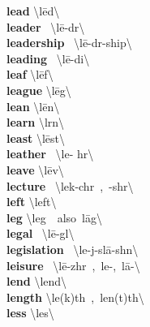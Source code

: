 \documentclass[10pt,a4paper]{article}
\begin{document}
\begin{multicols}{2}
\textbf{ lead }\quad \textbackslash \textprimstress l\={e}d\textbackslash \\
\textbf{ leader }\quad \ \textbackslash \textprimstress l\={e}-d\textschwa r\textbackslash \\
\textbf{ leadership }\quad \ \textbackslash \textprimstress l\={e}-d\textschwa r-\textsecstress ship\textbackslash \\
\textbf{ leading }\quad \ \textbackslash \textprimstress l\={e}-di\engma \textbackslash \\
\textbf{ leaf }\quad \textbackslash \textprimstress l\={e}f\textbackslash \\
\textbf{ league }\quad \textbackslash \textprimstress l\={e}g\textbackslash \\
\textbf{ lean }\quad \textbackslash \textprimstress l\={e}n\textbackslash \\
\textbf{ learn }\quad \textbackslash \textprimstress l\textschwa rn\textbackslash \\
\textbf{ least }\quad \textbackslash \textprimstress l\={e}st\textbackslash \\
\textbf{ leather }\quad \ \textbackslash \textprimstress le- h\textschwa r\textbackslash \\
\textbf{ leave }\quad \textbackslash \textprimstress l\={e}v\textbackslash \\
\textbf{ lecture }\quad \ \textbackslash \textprimstress lek-ch\textschwa r\ ,\ -sh\textschwa r\textbackslash \\
\textbf{ left }\quad \textbackslash \textprimstress left\textbackslash \\
\textbf{ leg }\quad \textbackslash \textprimstress leg\ \ also\ \textprimstress l\={a}g\textbackslash \\
\textbf{ legal }\quad \ \textbackslash \textprimstress l\={e}-g\textschwa l\textbackslash \\
\textbf{ legislation }\quad \ \textbackslash \textsecstress le-j\textschwa -\textprimstress sl\={a}-sh\textschwa n\textbackslash \\
\textbf{ leisure }\quad \ \textbackslash \textprimstress l\={e}-zh\textschwa r\ ,\ \textprimstress le-,\ \textprimstress l\={a}-\textbackslash \\
\textbf{ lend }\quad \textbackslash \textprimstress lend\textbackslash \\
\textbf{ length }\quad \textbackslash \textprimstress le\engma (k)th\ ,\ \textprimstress len(t)th\textbackslash \\
\textbf{ less }\quad \textbackslash \textprimstress les\textbackslash \\

\end{multicols}
\end{document}
